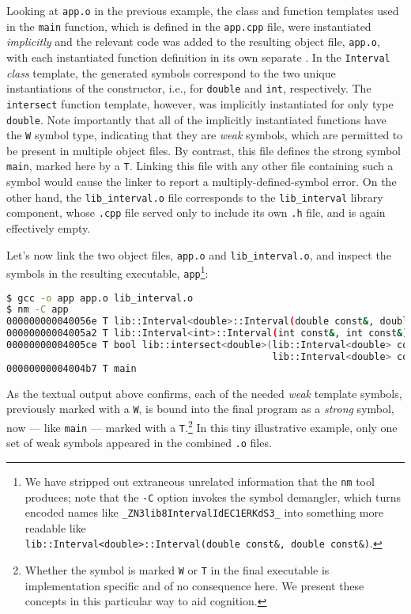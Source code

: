 \noindent Looking at \lstinline!app.o! in the previous example, the class and
function templates used in the \lstinline!main! function, which is
defined in the \lstinline!app.cpp! file, were instantiated
\emph{implicitly} and the relevant code was added to the resulting
object file, \lstinline!app.o!, with each instantiated function definition
in its own separate . In the \lstinline!Interval!
\emph{class} template, the generated symbols correspond to the two
unique instantiations of the constructor, i.e., for \lstinline!double! and
\lstinline!int!, respectively. The \lstinline!intersect! function
template, however, was implicitly instantiated for only type
\lstinline!double!. Note importantly that all of the implicitly
instantiated functions have the \lstinline!W! symbol type, indicating that
they are \emph{weak} symbols, which are permitted to be present in
multiple object files. By contrast, this file defines the strong symbol
\lstinline!main!, marked here by a \lstinline!T!. Linking this file with any
other file containing such a symbol would cause the linker to report a
multiply-defined-symbol error. On the other hand, the
\lstinline!lib_interval.o! file corresponds to the
\lstinline!lib_interval! library component, whose \lstinline!.cpp! file
served only to include its own \lstinline!.h! file, and is again
effectively empty.

Let's now link the two object files, \lstinline!app.o! and
\lstinline!lib_interval.o!, and inspect the symbols in the resulting
executable, \lstinline!app!{\cprotect\footnote{We have stripped out
extraneous unrelated information that the \lstinline!nm! tool produces;
note that the \lstinline!-C! option invokes the symbol demangler, which
turns encoded names like \lstinline!_ZN3lib8IntervalIdEC1ERKdS3_! into
something more readable like
  \lstinline!lib::Interval<double>::Interval(double!~\lstinline!const&,!~\lstinline!double!~\lstinline!const&)!.}}:

\begin{lstlisting}[language=bash]
$ gcc -o app app.o lib_interval.o
$ nm -C app
000000000040056e T lib::Interval<double>::Interval(double const&, double const&)
00000000004005a2 T lib::Interval<int>::Interval(int const&, int const&)
00000000004005ce T bool lib::intersect<double>(lib::Interval<double> const&,
                                               lib::Interval<double> const&)
00000000004004b7 T main
\end{lstlisting}

\noindent As the textual output above confirms, each of the needed \emph{weak}
template symbols, previously marked with a \lstinline!W!, is bound into the
final program as a \emph{strong} symbol, now --- like \lstinline!main! ---
marked with a \lstinline!T!.{\cprotect\footnote{Whether the symbol is
marked \lstinline!W! or \lstinline!T! in the final executable is
implementation specific and of no consequence here. We present these
  concepts in this particular way to aid cognition.}} In this tiny
illustrative example, only one set of weak symbols appeared in the
combined \lstinline!.o! files.

